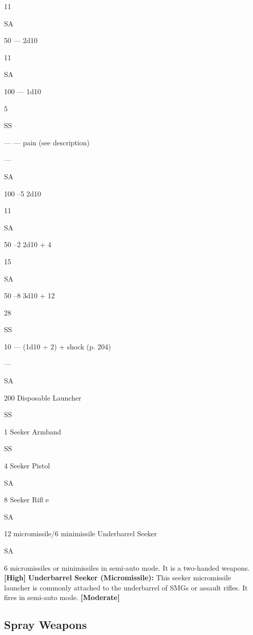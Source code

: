 11

SA

50
—
2d10

11

SA

100
—
1d10

5

SS

—
—
pain (see description)

—

SA

100
–5
2d10

11

SA

50
–2
2d10 + 4

15

SA

50
–8
3d10 + 12

28

SS

10
—
(1d10 ÷ 2) + shock (p. 204)

—

SA

200
Disposable Launcher

SS

1
Seeker Armband

SS

4
Seeker Pistol

SA

8
Seeker Riﬂ e

SA

12 micromissile/6 minimissile
Underbarrel Seeker

SA

6
micromissiles or minimissiles in semi-auto mode. It is 
a two-handed weapons. \textbf{[High]}
\textbf{Underbarrel Seeker (Micromissile):} This seeker 
micromissile launcher is commonly attached to the 
underbarrel of SMGs or assault rifles. It fires in semi-auto
mode. \textbf{[Moderate]}

\subsection{Spray Weapons}

